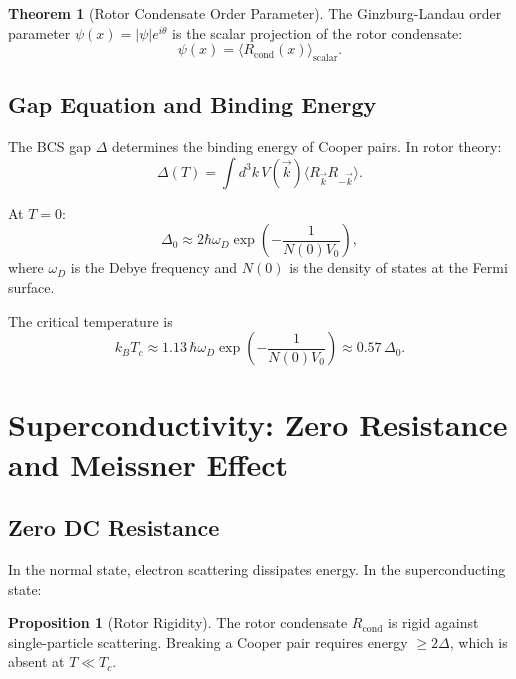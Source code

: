 \documentclass[12pt,a4paper]{article}
\theoremstyle{definition}
\newtheorem{theorem}{Theorem}[section]
\newtheorem{proposition}{Proposition}[section]
\theoremstyle{remark}
\begin{document}
\begin{theorem}[Rotor Condensate Order Parameter]
The Ginzburg-Landau order parameter $\psi(x) = |\psi| e^{i\theta}$ is the scalar projection of the rotor condensate:
\begin{equation}
\psi(x) = \langle R_{\text{cond}}(x) \rangle_{\text{scalar}}.
\end{equation}
\end{theorem}

\subsection{Gap Equation and Binding Energy}

The BCS gap $\Delta$ determines the binding energy of Cooper pairs. In rotor theory:
\begin{equation}
\Delta(T) = \int d^3k \, V(\vec{k}) \langle R_{\vec{k}} R_{-\vec{k}} \rangle.
\end{equation}

At $T=0$:
\begin{equation}
\Delta_0 \approx 2 \hbar \omega_D \exp\left(-\frac{1}{N(0) V_0}\right),
\end{equation}
where $\omega_D$ is the Debye frequency and $N(0)$ is the density of states at the Fermi surface.

The critical temperature is
\begin{equation}
k_B T_c \approx 1.13 \, \hbar \omega_D \exp\left(-\frac{1}{N(0) V_0}\right) \approx 0.57 \, \Delta_0.
\end{equation}

\section{Superconductivity: Zero Resistance and Meissner Effect}

\subsection{Zero DC Resistance}

In the normal state, electron scattering dissipates energy. In the superconducting state:

\begin{proposition}[Rotor Rigidity]
The rotor condensate $R_{\text{cond}}$ is rigid against single-particle scattering. Breaking a Cooper pair requires energy $\geq 2\Delta$, which is absent at $T \ll T_c$.
\end{proposition}
\end{document}
